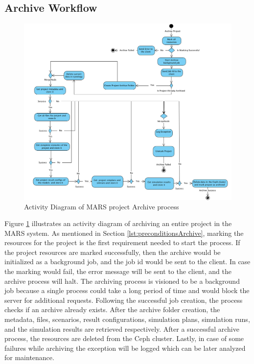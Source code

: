 \subsection{Archive Workflow}
\begin{figure}[H]
    \centering \includegraphics[scale=0.45]{grafiken/archiveActivity.png}
    \caption{Activity Diagram of MARS project Archive process}
    \label{fig:archiveActivity}
\end{figure}

Figure \ref{fig:archiveActivity} illustrates an activity diagram of archiving an entire project in the MARS system. As mentioned in Section \ref{lst:preconditionsArchive},
marking the resources for the project is the first requirement needed to start the process. If the project resources are marked successfully,
then the archive would be initialized as a background job, and the job id would be sent to the client. In case the marking would fail, the error message will be 
sent to the client, and the archive process will halt. The archiving process is visioned to be a background job because a single process could take
a long period of time and would block the server for additional requests. Following the successful job creation, the process checks if an archive already
exists. After
the archive folder creation, the metadata, files, scenarios, result configurations, simulation plans, simulation runs, and the simulation results are retrieved respectively.
After a successful archive process, the resources are deleted from the Ceph cluster. Lastly, in case of some failures while archiving the exception will be logged 
which can be later analyzed for maintenance.

